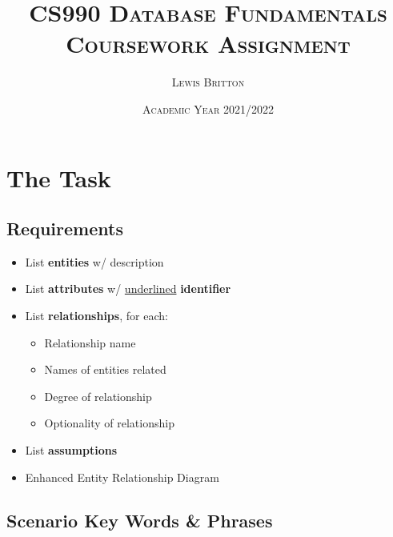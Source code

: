 \documentclass[11pt, english]{article}
\begin{document}

	\title{\textsc{CS990 Database Fundamentals\\ Coursework Assignment}}
	\author{\textsc{Lewis Britton}}
	\date{\textsc{Academic Year 2021/2022}}
        \maketitle

\newpage


	\renewcommand{\contentsname}{Table of Contents}

	\tableofcontents

\newpage


\section*{The Task}

	\subsection*{Requirements}

	\begin{itemize}
	\setlength\itemsep{0cm}
		\item List \textbf{entities} w/ description
		\item List \textbf{attributes} w/ \underline{underlined} \textbf{identifier}
		\item List \textbf{relationships}, for each:
		\begin{itemize}
			\item Relationship name
			\item Names of entities related
			\item Degree of relationship
			\item Optionality of relationship
		\end{itemize}
		\item List \textbf{assumptions}
		\item Enhanced Entity Relationship Diagram
	\end{itemize}

\newpage

	\subsection*{Scenario Key Words \& Phrases}
\end{document}
